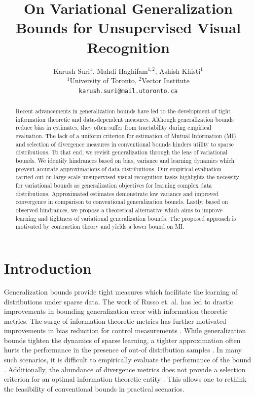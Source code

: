 \documentclass{article}
\title{On Variational Generalization Bounds for Unsupervised Visual Recognition}
\author{
  Karush Suri$^{1}$, Mahdi Haghifam$^{1,2}$, Ashish Khisti$^{1}$\\
   $^{1}$University of Toronto, $^{2}$Vector Institute\\
  \texttt{karush.suri@mail.utoronto.ca}
}
\begin{document}
\maketitle

\begin{abstract}
Recent advancements in generalization bounds have led to the development of tight information theoretic and data-dependent measures. Although generalization bounds reduce bias in estimates, they often suffer from tractability during empirical evaluation. The lack of a uniform criterion for estimation of Mutual Information (MI) and selection of divergence measures in conventional bounds hinders utility to sparse distributions. To that end, we revisit generalization through the lens of variational bounds. We identify hindrances based on bias, variance and learning dynamics which prevent accurate approximations of data distributions. Our empirical evaluation carried out on large-scale unsupervised visual recognition tasks highlights the necessity for variational bounds as generalization objectives for learning complex data distributions. Approximated estimates demonstrate low variance and improved convergence in comparison to conventional generalization bounds. Lastly, based on observed hindrances, we propose a theoretical alternative which aims to improve learning and tightness of variational generalization bounds. The proposed approach is motivated by contraction theory and yields a lower bound on MI.   
\end{abstract}

\section{Introduction}
Generalization bounds provide tight measures which facilitate the learning of distributions under sparse data. The work of Russo et. al. \cite{russo} has led to drastic improvements \cite{xu,negrea} in bounding generalization error with information theoretic metrics. The surge of information theoretic metrics \cite{xu,bu} has further motivated improvements in bias reduction for control measurements \cite{control}. While generalization bounds tighten the dynamics of sparse learning, a tighter approximation often hurts the performance in the presence of out-of distribution samples \cite{mine}. In many such scenarios, it is difficult to empirically evaluate the performance of the bound \cite{control}. Additionally, the abundance of divergence metrics does not provide a selection criterion for an optimal information theoretic entity \cite{book, measures}. This allows one to rethink the feasibility of conventional bounds in practical scenarios. 
\end{document}
